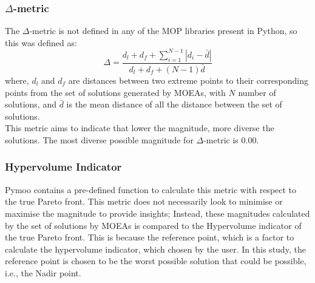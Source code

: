 \documentclass[sigconf, nonacm, preprint]{acmart}
\begin{document}
\subsubsection{$\Delta$-metric}
The $\Delta$-metric is not defined in any of the MOP libraries present in Python, so this was defined as\cite{cai2018,yan2007}:
\begin{equation}
    \Delta = \frac{d_{l} + d_{f} + \sum_{i=1}^{N-1} |d_{i}-\bar{d}|}{d_{l} + d_{f} + (N-1)\bar{d}}
\end{equation}
where, $d_{l}$ and $d_{f}$ are distances between two extreme points to their corresponding points from the set of solutions generated by MOEAs, with $N$ number of solutions, and $\bar{d}$ is the mean distance of all the distance between the set of solutions. \\
This metric aims to indicate that lower the magnitude, more diverse the solutions. The most diverse possible magnitude for $\Delta$-metric is $0.00$.
\subsubsection{Hypervolume Indicator}
Pymoo \cite{pymoo2022} contains a pre-defined function to calculate this metric with respect to the true Pareto front. This metric does not necessarily look to minimise or maximise the magnitude to provide insights; Instead, these magnitudes calculated by the set of solutions by MOEAs is compared to the Hypervolume indicator of the true Pareto front. This is because the reference point, which is a factor to calculate the hypervolume indicator, which chosen by the user. In this study, the reference point is chosen to be the worst possible solution that could be possible, i.e., the Nadir point.
\end{document}
